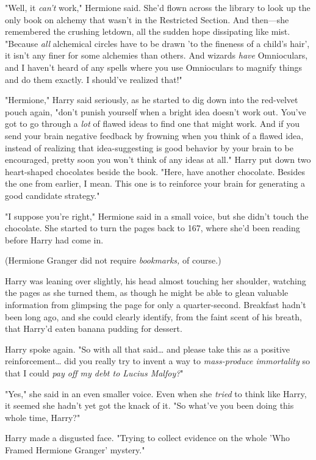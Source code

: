 "Well, it \emph{can't} work," Hermione said. She'd flown across the library to 
look up the only book on alchemy that wasn't in the Restricted Section. And 
then---she remembered the crushing letdown, all the sudden hope dissipating 
like mist. "Because \emph{all} alchemical circles have to be drawn 'to the 
fineness of a child's hair', it isn't any finer for some alchemies than others. 
And wizards \emph{have} Omnioculars, and I haven't heard of any spells where 
you use Omnioculars to magnify things and do them exactly. I should've realized 
that!"

"Hermione," Harry said seriously, as he started to dig down into the red-velvet 
pouch again, "don't punish yourself when a bright idea doesn't work out. You've 
got to go through a \emph{lot} of flawed ideas to find one that might work. And 
if you send your brain negative feedback by frowning when you think of a flawed 
idea, instead of realizing that idea-suggesting is good behavior by your brain 
to be encouraged, pretty soon you won't think of any ideas at all." Harry put 
down two heart-shaped chocolates beside the book. "Here, have another 
chocolate. Besides the one from earlier, I mean. This one is to reinforce your 
brain for generating a good candidate strategy."

"I suppose you're right," Hermione said in a small voice, but she didn't touch 
the chocolate. She started to turn the pages back to 167, where she'd been 
reading before Harry had come in.

(Hermione Granger did not require \emph{bookmarks,} of course.)

Harry was leaning over slightly, his head almost touching her shoulder, 
watching the pages as she turned them, as though he might be able to glean 
valuable information from glimpsing the page for only a quarter-second. 
Breakfast hadn't been long ago, and she could clearly identify, from the faint 
scent of his breath, that Harry'd eaten banana pudding for dessert.

Harry spoke again. "So with all that said{\ldots} and please take this as a 
positive reinforcement{\ldots} did you really try to invent a way to 
\emph{mass-produce immortality} so that I could \emph{pay off my debt to Lucius 
Malfoy?}"

"Yes," she said in an even smaller voice. Even when she \emph{tried} to think 
like Harry, it seemed she hadn't yet got the knack of it. "So what've you been 
doing this whole time, Harry?"

Harry made a disgusted face. "Trying to collect evidence on the whole 'Who 
Framed Hermione Granger' mystery."

